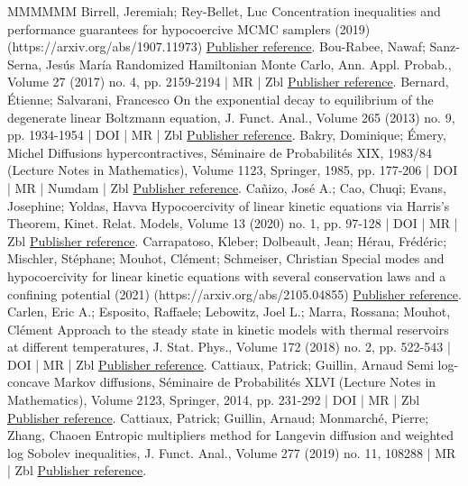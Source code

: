 \documentclass[10pt,a4paper]{article}
\numberwithin{equation}{section}
\begin{document}
\begin{thebibliography}{MMMMMM}
 Birrell, Jeremiah; Rey-Bellet, Luc Concentration inequalities and performance guarantees for hypocoercive MCMC samplers (2019) (https://arxiv.org/abs/1907.11973) \href{https://ahl.centre-mersenne.org/item/AHL_2022__5__523_0/#BRB19}{Publisher reference}.
 Bou-Rabee, Nawaf; Sanz-Serna, Jesús María Randomized Hamiltonian Monte Carlo, Ann. Appl. Probab., Volume 27 (2017) no. 4, pp. 2159-2194 | MR | Zbl \href{https://ahl.centre-mersenne.org/item/AHL_2022__5__523_0/#BRSS17}{Publisher reference}.
 Bernard, Étienne; Salvarani, Francesco On the exponential decay to equilibrium of the degenerate linear Boltzmann equation, J. Funct. Anal., Volume 265 (2013) no. 9, pp. 1934-1954 | DOI | MR | Zbl \href{https://ahl.centre-mersenne.org/item/AHL_2022__5__523_0/#BS13}{Publisher reference}.
 Bakry, Dominique; Émery, Michel Diffusions hypercontractives, Séminaire de Probabilités XIX, 1983/84 (Lecture Notes in Mathematics), Volume 1123, Springer, 1985, pp. 177-206 | DOI | MR | Numdam | Zbl \href{https://ahl.centre-mersenne.org/item/AHL_2022__5__523_0/#BE85}{Publisher reference}.
 Cañizo, José A.; Cao, Chuqi; Evans, Josephine; Yoldas, Havva Hypocoercivity of linear kinetic equations via Harris’s Theorem, Kinet. Relat. Models, Volume 13 (2020) no. 1, pp. 97-128 | DOI | MR | Zbl \href{https://ahl.centre-mersenne.org/item/AHL_2022__5__523_0/#CCEY19}{Publisher reference}.
 Carrapatoso, Kleber; Dolbeault, Jean; Hérau, Frédéric; Mischler, Stéphane; Mouhot, Clément; Schmeiser, Christian Special modes and hypocoercivity for linear kinetic equations with several conservation laws and a confining potential (2021) (https://arxiv.org/abs/2105.04855) \href{https://ahl.centre-mersenne.org/item/AHL_2022__5__523_0/#CDHMMS21}{Publisher reference}.
 Carlen, Eric A.; Esposito, Raffaele; Lebowitz, Joel L.; Marra, Rossana; Mouhot, Clément Approach to the steady state in kinetic models with thermal reservoirs at different temperatures, J. Stat. Phys., Volume 172 (2018) no. 2, pp. 522-543 | DOI | MR | Zbl \href{https://ahl.centre-mersenne.org/item/AHL_2022__5__523_0/#CELMM}{Publisher reference}.
 Cattiaux, Patrick; Guillin, Arnaud Semi log-concave Markov diffusions, Séminaire de Probabilités XLVI (Lecture Notes in Mathematics), Volume 2123, Springer, 2014, pp. 231-292 | DOI | MR | Zbl \href{https://ahl.centre-mersenne.org/item/AHL_2022__5__523_0/#CG14}{Publisher reference}.
 Cattiaux, Patrick; Guillin, Arnaud; Monmarché, Pierre; Zhang, Chaoen Entropic multipliers method for Langevin diffusion and weighted log Sobolev inequalities, J. Funct. Anal., Volume 277 (2019) no. 11, 108288 | MR | Zbl \href{https://ahl.centre-mersenne.org/item/AHL_2022__5__523_0/#CGMZ19}{Publisher reference}.

\end{thebibliography}
\end{document}
